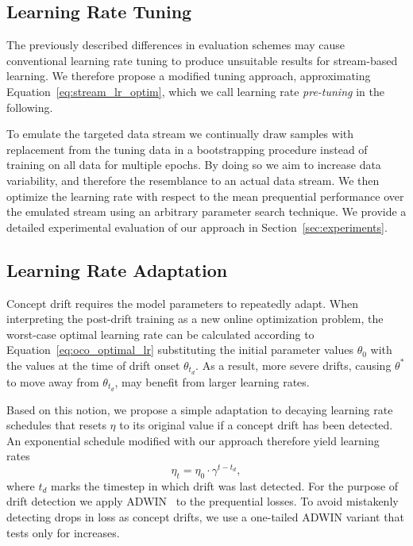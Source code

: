 \documentclass[runningheads]{llncs}
\begin{document}
\subsection{Learning Rate Tuning}\label{subsec:pre-tuning}

The previously described differences in evaluation schemes may cause conventional learning rate tuning to produce unsuitable results for stream-based learning.
We therefore propose a modified tuning approach, approximating Equation~\eqref{eq:stream_lr_optim}, which we call learning rate \textit{pre-tuning} in the following.

To emulate the targeted data stream we continually draw samples with replacement from the tuning data in a bootstrapping procedure instead of training on all data for multiple epochs.
By doing so we aim to increase data variability, and therefore the resemblance to an actual data stream.
We then optimize the learning rate with respect to the mean prequential performance over the emulated stream using an arbitrary parameter search technique.
We provide a detailed experimental evaluation of our approach in Section~\ref{sec:experiments}.

\subsection{Learning Rate Adaptation}

Concept drift requires the model parameters to repeatedly adapt.
When interpreting the post-drift training as a new online optimization problem, the worst-case optimal learning rate can be calculated according to Equation~\ref{eq:oco_optimal_lr} substituting the initial parameter values $\theta_0$ with the values at the time of drift onset $\theta_{t_d}$.
As a result, more severe drifts, causing $\theta^*$ to move away from $\theta_{t_d}$, may benefit from larger learning rates.

Based on this notion, we propose a simple adaptation to decaying learning rate schedules that resets $\eta$ to its original value if a concept drift has been detected.
An exponential schedule modified with our approach therefore yield learning rates
\begin{equation}
	\eta_t = \eta_0 \cdot \gamma^{t-t_d},
\end{equation}\label{eq:drift_reset}
where $t_d$ marks the timestep in which drift was last detected.
For the purpose of drift detection we apply ADWIN~\cite{bifetLearningTimeChangingData2007} to the prequential losses.
To avoid mistakenly detecting drops in loss as concept drifts, we use a one-tailed ADWIN variant that tests only for increases.
\end{document}
